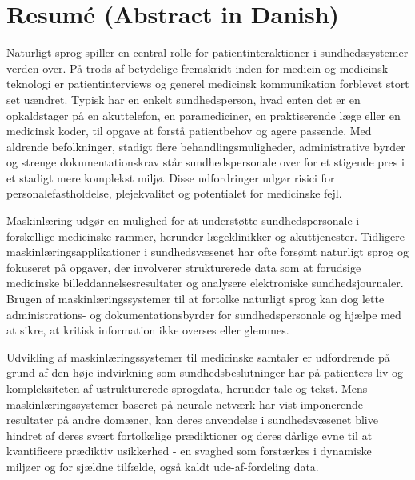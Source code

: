 
\chapter[resumé (abstract in danish)]{Resumé (Abstract in Danish)}

Naturligt sprog spiller en central rolle for patientinteraktioner i sundhedssystemer verden over. 
På trods af betydelige fremskridt inden for medicin og medicinsk teknologi er patientinterviews og generel medicinsk kommunikation forblevet stort set uændret. Typisk har en enkelt sundhedsperson, hvad enten det er en opkaldstager på en akuttelefon, en paramediciner, en praktiserende læge eller en medicinsk koder, til opgave at forstå patientbehov og agere passende. Med aldrende befolkninger, stadigt flere behandlingsmuligheder, administrative byrder og strenge dokumentationskrav står sundhedspersonale over for et stigende pres i et stadigt mere komplekst miljø. Disse udfordringer udgør risici for personalefastholdelse, plejekvalitet og potentialet for medicinske fejl.

Maskinlæring udgør en mulighed for at understøtte sundhedspersonale i forskellige medicinske rammer, herunder lægeklinikker og akuttjenester. Tidligere maskinlæringsapplikationer i sundhedsvæsenet har ofte forsømt naturligt sprog og fokuseret på opgaver, der involverer strukturerede data som at forudsige medicinske billeddannelsesresultater og analysere elektroniske sundhedsjournaler. Brugen af maskinlæringssystemer til at fortolke naturligt sprog kan dog lette administrations- og dokumentationsbyrder for sundhedspersonale og hjælpe med at sikre, at kritisk information ikke overses eller glemmes.

Udvikling af maskinlæringssystemer til medicinske samtaler er udfordrende på grund af den høje indvirkning som sundhedsbeslutninger har på patienters liv og kompleksiteten af ustrukturerede sprogdata, herunder tale og tekst. Mens maskinlæringssystemer baseret på neurale netværk har vist imponerende resultater på andre domæner, kan deres anvendelse i sundhedsvæsenet blive hindret af deres svært fortolkelige prædiktioner og deres dårlige evne til at kvantificere prædiktiv usikkerhed - en svaghed som forstærkes i dynamiske miljøer og for sjældne tilfælde, også kaldt ude-af-fordeling data.

